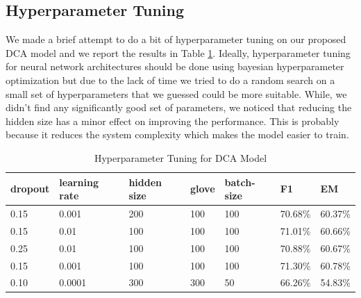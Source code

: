 \documentclass{article} %
\begin{document}
%



\subsection{Hyperparameter Tuning}
We made a brief attempt to do a bit of hyperparameter tuning on our proposed DCA model and we report the results in Table \ref{tb:hyper}. Ideally, hyperparameter tuning for neural network architectures should be done using bayesian hyperparameter optimization but due to the lack of time we tried to do a random search on a small set of hyperparameters that we guessed could be more suitable. While, we didn't find any significantly good set of parameters, we noticed that reducing the hidden size has a minor effect on improving the performance. This is probably because it reduces the system complexity which makes the model easier to train.
\begin{center}
\begin{table}[ht]
\caption{Hyperparameter Tuning for DCA Model}
{\small
\hfill{}
       \begin{tabular}{ p{1.5cm}  p{1.8cm} p{1.5cm} p{1.5cm} p{1.5cm} p{1.0cm} p{1.0cm}}
    \bfseries dropout  & \bfseries learning rate  & \bfseries hidden size  &  \bfseries glove  & \bfseries batch-size  &   \bfseries F1  &     \bfseries  EM \\ \hline
    0.15 & 0.001 &200 &  100 &100 			  & 70.68\% & 60.37\%\\ 
    0.15 & 0.01 &100 &  100 &100 			  & 71.01\% & 60.66\%\\ 
    0.25& 0.01&100&100&100 	  		  & 70.88\% & 60.67\%\\
    0.15& 0.001&100&100&100 	  	  & 71.30\% & 60.78\%\\
    0.10 & 0.0001&300&300&50  &66.26\% & 54.83\%\\ 

    \hline
    \end{tabular}
}
\hfill{}
\label{tb:hyper}
\end{table}
\end{center}
\end{document}
